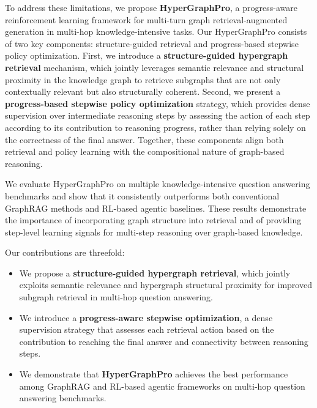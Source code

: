 To address these limitations, we propose \textbf{HyperGraphPro}, a progress-aware reinforcement learning framework for multi-turn graph retrieval-augmented generation in multi-hop knowledge-intensive tasks.
Our HyperGraphPro consists of two key components: structure-guided retrieval and progress-based stepwise policy optimization.
First, we introduce a \textbf{structure-guided hypergraph retrieval} mechanism, which jointly leverages semantic relevance and structural proximity in the knowledge graph to retrieve subgraphs that are not only contextually relevant but also structurally coherent.
Second, we present a \textbf{progress-based stepwise policy optimization} strategy, which provides dense supervision over intermediate reasoning steps by assessing the action of each step according to its contribution to reasoning progress, rather than relying solely on the correctness of the final answer.
Together, these components align both retrieval and policy learning with the compositional nature of graph-based reasoning.


We evaluate HyperGraphPro on multiple knowledge-intensive question answering benchmarks and show that it consistently outperforms both conventional GraphRAG methods and RL-based agentic baselines.
These results demonstrate the importance of incorporating graph structure into retrieval and of providing step-level learning signals for multi-step reasoning over graph-based knowledge.

Our contributions are threefold:
\begin{itemize}
    \item We propose a \textbf{structure-guided hypergraph retrieval}, which jointly exploits semantic relevance and hypergraph structural proximity for improved subgraph retrieval in multi-hop question answering.
    \item We introduce a \textbf{progress-aware stepwise optimization}, a dense supervision strategy that assesses each retrieval action based on the contribution to reaching the final answer and connectivity between reasoning steps.
    \item We demonstrate that \textbf{HyperGraphPro} achieves the best performance among GraphRAG and RL-based agentic frameworks on multi-hop question answering benchmarks.
\end{itemize}